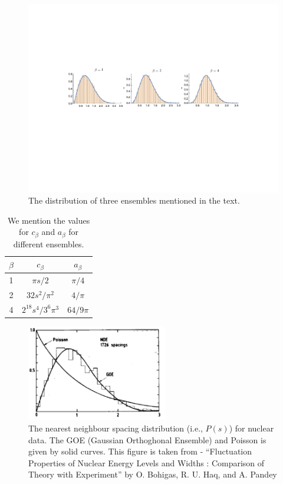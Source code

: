 \documentclass[11pt]{article}
\begin{document}
\begin{figure}[htbp] 
	\centering 
	\includegraphics[width=1.05\textwidth]{figs/ensem.pdf}
	\caption{\label{fig:ensem1}The distribution of three ensembles mentioned in the text.}
\end{figure}



\begin{table}[h!]
	\centering
	\begin{tabular}{||c c c||} 
		\hline
		$\beta$ & $c_{\beta}$ & $a_{\beta}$ \\ [0.5ex] 
		\hline\hline
		1 & $\pi s/2$ & $\pi/4$  \\ 
		2 & $32 s^2/\pi^2$ & $4/\pi$  \\
		4 & $2^{18} s^4/3^6 \pi^3$ & $64/9\pi$
		 \\ [1ex] 
		\hline 
	\end{tabular}
\caption{We mention the values for $c_{\beta}$ and $a_{\beta}$ for different ensembles.}
\label{table:c_and_a}
\end{table}


\begin{figure}[htbp] 
	\centering 
	\includegraphics[width=0.55\textwidth]{figs/data_exp.png}
	\caption{\label{fig:data_exp1}The nearest neighbour spacing distribution (i.e., $P(s)$) 
	for nuclear data. The GOE (Gaussian Orthoghonal Ensemble) and Poisson is given 
	by solid curves. This figure is taken from - ``Fluctuation Properties of Nuclear Energy 
	Levels and Widths : Comparison of Theory with Experiment'' by O. Bohigas, R. U. 
	Haq, and A. Pandey}
\end{figure}
\end{document}
